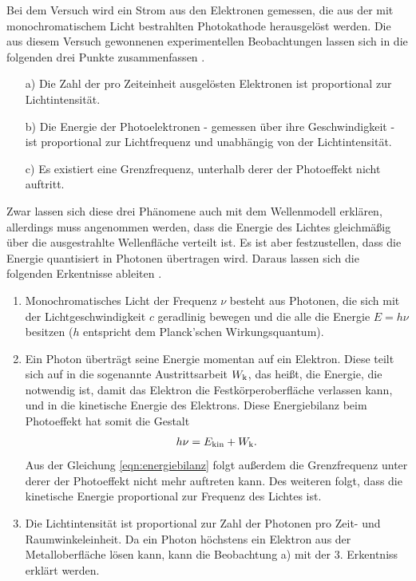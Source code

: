 \noindent
Bei dem Versuch wird ein Strom aus den Elektronen gemessen, die aus der mit monochromatischem Licht bestrahlten Photokathode herausgelöst werden. Die aus
diesem Versuch gewonnenen experimentellen Beobachtungen lassen sich in die folgenden drei Punkte zusammenfassen \cite{Anleitung500}.
\begin{itemize}
    \item[a)] Die Zahl der pro Zeiteinheit ausgelösten Elektronen ist proportional zur Lichtintensität.
    \item[b)] Die Energie der Photoelektronen - gemessen über ihre Geschwindigkeit - ist proportional zur Lichtfrequenz und unabhängig von der Lichtintensität.
    \item[c)] Es existiert eine Grenzfrequenz, unterhalb derer der Photoeffekt nicht auftritt.
\end{itemize}
Zwar lassen sich diese drei Phänomene auch mit dem Wellenmodell erklären, allerdings muss angenommen werden, dass die Energie des Lichtes gleichmäßig über die
ausgestrahlte Wellenfläche verteilt ist. Es ist aber festzustellen, dass die Energie quantisiert in Photonen übertragen wird. Daraus lassen sich die folgenden Erkentnisse
ableiten \cite{Anleitung500}.
\begin{enumerate}
    \item Monochromatisches Licht der Frequenz $\nu$ besteht aus Photonen, die sich mit der Lichtgeschwindigkeit $c$ geradlinig bewegen und die alle die Energie $E=h\nu$ 
        besitzen ($h$ entspricht dem Planck'schen Wirkungsquantum).
    \item Ein Photon überträgt seine Energie momentan auf ein Elektron. Diese teilt sich auf in die sogenannte Austrittsarbeit $W_{\text k}$, das heißt, die Energie, 
        die notwendig ist, damit das Elektron die Festkörperoberfläche verlassen kann, und in die kinetische Energie des Elektrons. Diese Energiebilanz beim Photoeffekt 
        hat somit die Gestalt
        \begin{align}
            \label{eqn:energiebilanz}
            h\nu = E_{\text{kin}} + W_{\text k}.
        \end{align}
        Aus der Gleichung \eqref{eqn:energiebilanz} folgt außerdem die Grenzfrequenz unter derer der Photoeffekt nicht mehr auftreten kann. Des weiteren folgt, dass die kinetische
        Energie proportional zur Frequenz des Lichtes ist.
        \item Die Lichtintensität ist proportional zur Zahl der Photonen pro Zeit- und Raumwinkeleinheit. Da ein Photon höchstens ein Elektron aus der Metalloberfläche lösen kann, kann die Beobachtung a) mit der
            3. Erkentniss erklärt werden.
\end{enumerate}

